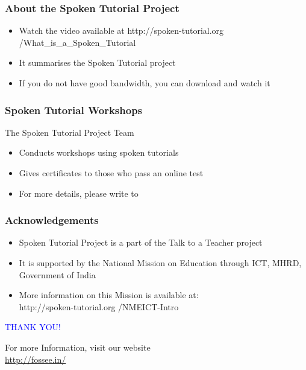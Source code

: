 \documentclass[17pt,compress]{beamer}
\begin{document}
\begin{frame}
\frametitle{About the Spoken Tutorial Project}
\begin{itemize}
\item Watch the video available at {\color{blue}http://spoken-tutorial.org /What\_is\_a\_Spoken\_Tutorial}
\item It summarises the Spoken Tutorial project \pause
\item If you do not have good bandwidth, you can download and watch it
\end{itemize}
\end{frame}
\begin{frame}
\frametitle{Spoken Tutorial Workshops}The Spoken Tutorial Project Team 
\begin{itemize}
\item Conducts workshops using spoken tutorials 
\item Gives certificates to those who pass an online test 
\item For more details, please write to \\ 
\end{itemize}
\end{frame}
\begin{frame}
\frametitle{Acknowledgements}
\begin{itemize}
\item Spoken Tutorial Project is a part of the Talk to a Teacher  project 
\item It is supported by the National Mission on Education through  ICT, MHRD, Government of India 
\item More information on this Mission is available at: \\{\color{blue}http://spoken-tutorial.org /NMEICT-Intro}
\end{itemize}
\end{frame}
\begin{frame}

  \begin{block}{}
  \begin{center}
  \textcolor{blue}{\Large THANK YOU!} 
  \end{center}
  \end{block}
\begin{block}{}
  \begin{center}
    For more Information, visit our website\\
    \url{http://fossee.in/}
  \end{center}  
  \end{block}
\end{frame}
\end{document}
